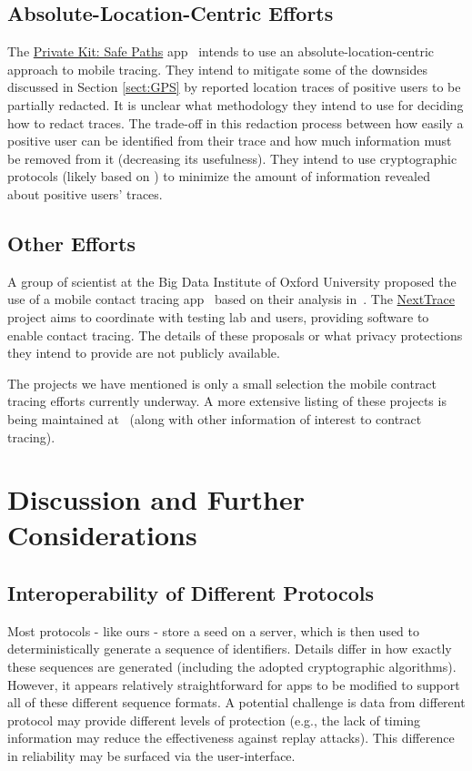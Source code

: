 \documentclass{article}
\begin{document}
\subsection{Absolute-Location-Centric Efforts}
The \href{http://safepaths.mit.edu/}{Private Kit: Safe Paths} app~\cite{safepaths,safepaths2} intends to use an absolute-location-centric approach to mobile tracing.
They intend to mitigate some of the downsides discussed in Section \ref{sect:GPS} by reported location traces of positive users to be partially redacted.
It is unclear what methodology they intend to use for deciding how to redact traces. The trade-off in this redaction process between how easily a positive user can be identified from their trace and how much information must be removed from it (decreasing its usefulness). 
They intend to use cryptographic protocols (likely based on \cite{safepathsmaybe}) to minimize the amount of information revealed about positive users' traces.

\subsection{Other Efforts}
A group of scientist at the Big Data Institute of Oxford University proposed the use of a mobile contact tracing app~\cite{oxford,oxford2} based on their analysis in~\cite{oxford3}.
The \href{https://nexttrace.org/}{NextTrace}~\cite{nexttrace} project aims to coordinate with testing lab and users, providing software to enable contact tracing.
The details of these proposals or what privacy protections they intend to provide are not publicly available.

The projects we have mentioned is only a small selection the mobile contract tracing efforts currently underway.
A more extensive listing of these projects is being maintained at~\cite{gdoc} (along with other information of interest to contract tracing).

\section{Discussion and Further Considerations}

\subsection{Interoperability of Different Protocols}

Most protocols - like ours - store a seed on a server, which is then used to deterministically generate a sequence of identifiers. Details differ in how exactly these sequences are generated (including the adopted cryptographic algorithms).  However, it appears relatively straightforward for apps to be modified to support all of these different sequence formats. A potential challenge is data from different protocol may provide different levels of protection (e.g., the lack of timing information may reduce the effectiveness against replay attacks). This difference in reliability may be surfaced via the user-interface.
\end{document}
